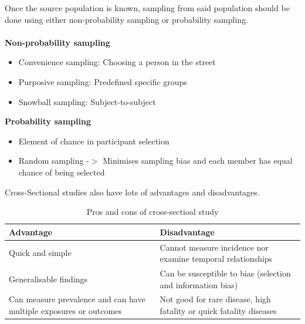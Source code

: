 \documentclass{article}
\begin{document}
Once the source population is known, sampling from said population should be done using either non-probability sampling or probability sampling.
\\~\\
\textbf{Non-probability sampling}
\begin{itemize}
    \item Convenience sampling: Choosing a person in the street
    \item Purposive sampling: Predefined specific groups
    \item Snowball sampling: Subject-to-subject
\end{itemize}

\textbf{Probability sampling}
\begin{itemize}
    \item Element of chance in participant selection
    \item Random sampling -$>$ Minimises sampling bias and each member has equal chance of being selected
\end{itemize}

Cross-Sectional studies also have lots of advantages and disadvantages.
\begin{table}[H]
\centering
\begin{tabularx}{\textwidth}{|X|X|}
\hline
\textbf{Advantage} & \textbf{Disadvantage} \\ \hline
Quick and simple & Cannot measure incidence nor examine temporal relationships \\ \hline
Generalisable findings & Can be susceptible to bias (selection and information bias) \\ \hline
Can measure prevalence and can have multiple exposures or outcomes & Not good for rare disease, high fatality or quick fatality diseases \\ \hline
\end{tabularx}
\caption{Pros and cons of cross-sectioal study}
\label{tab:pros-cons-cross-sec-study}
\end{table}
\end{document}
